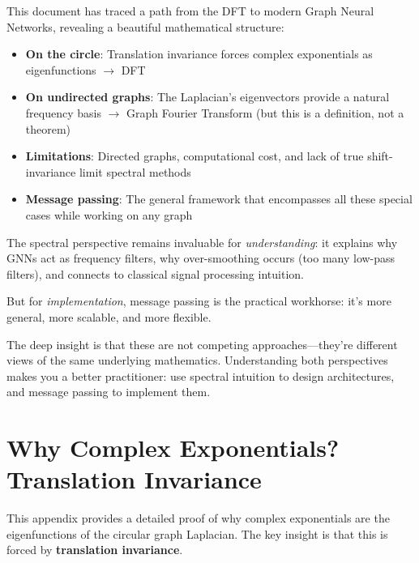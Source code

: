 \begin{notechapter}
\begin{center}
\begin{tikzpicture}
\end{tikzpicture}
\end{center}

\begin{remark}
This document has traced a path from the DFT to modern Graph Neural 
Networks, revealing a beautiful mathematical structure:

\begin{itemize}
\item \textbf{On the circle}: Translation invariance forces complex 
      exponentials as eigenfunctions $\rightarrow$ DFT
\item \textbf{On undirected graphs}: The Laplacian's eigenvectors 
      provide a natural frequency basis $\rightarrow$ Graph Fourier 
      Transform (but this is a definition, not a theorem)
\item \textbf{Limitations}: Directed graphs, computational cost, and 
      lack of true shift-invariance limit spectral methods
\item \textbf{Message passing}: The general framework that encompasses 
      all these special cases while working on any graph
\end{itemize}

The spectral perspective remains invaluable for \emph{understanding}:
it explains why GNNs act as frequency filters, why over-smoothing 
occurs (too many low-pass filters), and connects to classical signal 
processing intuition.

But for \emph{implementation}, message passing is the practical 
workhorse: it's more general, more scalable, and more flexible.

The deep insight is that these are not competing approaches---they're 
different views of the same underlying mathematics. Understanding both 
perspectives makes you a better practitioner: use spectral intuition 
to design architectures, and message passing to implement them.
\end{remark}

\newpage
\chapterappendix
\section{Why Complex Exponentials? Translation Invariance}
\label{dft-to-gnn:app:translation-invariance}

This appendix provides a detailed proof of why complex exponentials 
are the eigenfunctions of the circular graph Laplacian. The key insight 
is that this is forced by \textbf{translation invariance}.


\end{notechapter}
